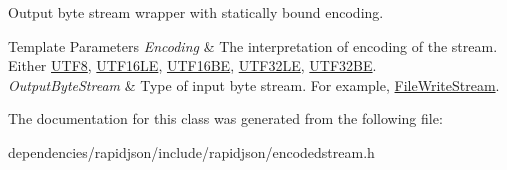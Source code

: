 Output byte stream wrapper with statically bound encoding. 


\begin{DoxyTemplParams}{Template Parameters}
{\em Encoding} & The interpretation of encoding of the stream. Either \hyperlink{struct_u_t_f8}{U\+T\+F8}, \hyperlink{struct_u_t_f16_l_e}{U\+T\+F16\+LE}, \hyperlink{struct_u_t_f16_b_e}{U\+T\+F16\+BE}, \hyperlink{struct_u_t_f32_l_e}{U\+T\+F32\+LE}, \hyperlink{struct_u_t_f32_b_e}{U\+T\+F32\+BE}. \\
\hline
{\em Output\+Byte\+Stream} & Type of input byte stream. For example, \hyperlink{class_file_write_stream}{File\+Write\+Stream}. \\
\hline
\end{DoxyTemplParams}


The documentation for this class was generated from the following file\+:\begin{DoxyCompactItemize}
\item 
dependencies/rapidjson/include/rapidjson/encodedstream.\+h\end{DoxyCompactItemize}
